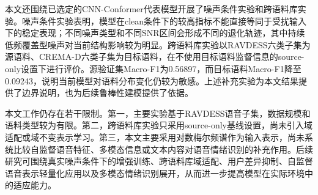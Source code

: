 \begin{conclusion}
本文还围绕已选定的CNN-Conformer代表模型开展了噪声条件实验和跨语料库实验。噪声条件实验表明，模型在clean条件下的较高指标不能直接等同于受扰输入下的稳定表现；不同噪声类型和不同SNR区间会形成不同的退化轨迹，其中持续低频覆盖型噪声对当前结构影响较为明显。跨语料库实验以RAVDESS六类子集为源语料、CREMA-D六类子集为目标语料，在不使用目标语料监督信息的source-only设置下进行评价。源验证集Macro-F1为0.56897，而目标语料Macro-F1降至0.09243，说明当前模型对语料分布变化仍较为敏感。上述补充实验为本文结果提供了边界说明，也为后续鲁棒性建模提供了依据。

本文工作仍存在若干限制。第一，主要实验基于RAVDESS语音子集，数据规模和语料类型较为有限。第二，跨语料库实验只采用source-only基线设置，尚未引入域适配或域不变表示学习。第三，本文主要采用对数梅尔频谱作为输入表示，尚未系统比较自监督语音特征、多模态信息或文本内容对语音情绪识别的补充作用。后续研究可围绕真实噪声条件下的增强训练、跨语料库域适配、用户差异抑制、自监督语音表示轻量化应用以及多模态情绪识别展开，从而进一步提高模型在实际环境中的适应能力。
\end{conclusion}
